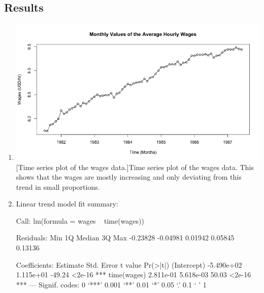 \subsection{Results}
\begin{enumerate}[label=(\alph*)]
    \item \begin{minipage}[!h]{\linewidth}
        \centering
        \includegraphics[width=\linewidth]{Images/P1/TS_Plot.png}
        [Time series plot of the wages data.]{Time series plot of the wages data. This shows that the wages are mostly increasing and only deviating from this trend in small proportions.}
        \label{fig:p1_ts}
    \end{minipage}
    \item Linear trend model fit summary: \small\begin{block}
Call:
lm(formula = wages ~ time(wages))

Residuals:
     Min       1Q   Median       3Q      Max 
-0.23828 -0.04981  0.01942  0.05845  0.13136 

Coefficients:
              Estimate Std. Error t value Pr(>|t|)    
(Intercept) -5.490e+02  1.115e+01  -49.24   <2e-16 ***
time(wages)  2.811e-01  5.618e-03   50.03   <2e-16 ***
---
Signif. codes:  0 ‘***’ 0.001 ‘**’ 0.01 ‘*’ 0.05 ‘.’ 0.1 ‘ ’ 1


\end{block}
\end{enumerate}
